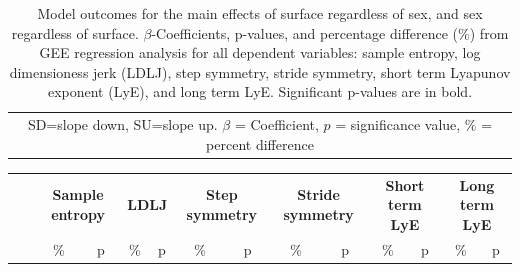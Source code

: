 \documentclass[authoryear,preprint,review,12pt]{elsarticle}
\begin{document}
{\begin{landscape}
\begin{table}[t]
\begin{tabular}{cccc|ccc|ccc|ccc|ccc|ccc}
         \multicolumn{19}{c}{\scriptsize SD=slope down, SU=slope up. $\beta$ = Coefficient, $p$ = significance value, $\%$ = percent difference}
    \end{tabular}
    \caption{Model outcomes for the main effects of surface regardless of sex, and sex regardless of surface. $\beta$-Coefficients, p-values, and percentage difference ($\%$) from GEE regression analysis for all dependent variables: sample entropy, log dimensioness jerk (LDLJ), step symmetry, stride symmetry, short term Lyapunov exponent (LyE), and long term LyE. Significant p-values are in bold.}
    \label{tab:main-effect-GEE}
\end{table}


\begin{table}[]
    \scriptsize
    \centering
    \begin{tabular}{cccc|cc|cc|cc|cc|cc}
       &  &  \multicolumn{2}{c|}{\textbf{Sample entropy}} & \multicolumn{2}{c|}{\textbf{LDLJ}} & \multicolumn{2}{c|}{\textbf{Step symmetry}} & \multicolumn{2}{c|}{\textbf{Stride symmetry}} & \multicolumn{2}{c|}{\textbf{Short term LyE}} & \multicolumn{2}{c}{\textbf{Long term LyE}}\\

& & \% & p& \% & p& \% & p& \% & p& \% & p& \% & p \\ \hline
       

\end{tabular}
\end{table}
\end{landscape}}
\end{document}
